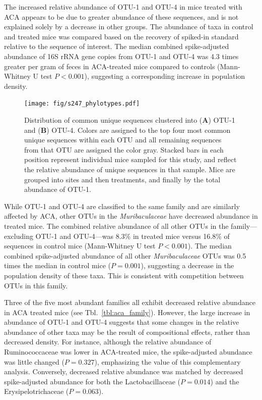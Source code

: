 \documentclass{doc/template/bmcart-nofigbox}
\newcommand{\frnlang}[1]{\textit{#1}}
\newcommand{\taxon}[1]{\frnlang{#1}}
\begin{document}
The increased relative abundance of OTU-1 and OTU-4 in mice treated with
ACA appears to be due to greater abundance of these sequences, and is not
explained solely by a decrease in other groups.
The abundance of taxa in control and treated mice was
compared based on the recovery of spiked-in standard relative to the sequence
of interest.
The median combined spike-adjusted abundance of 16S rRNA gene copies from OTU-1
and OTU-4 was 4.3 times greater per gram of feces in ACA-treated mice compared
to controls (Mann-Whitney U test $P < 0.001$),
suggesting a corresponding increase in population density.

\begin{figure}
\texttt{[image: fig/s247\_phylotypes.pdf]}
  \caption{\label{fig:s247_phylotypes}
  Distribution of common unique sequences clustered
  into (\textbf{A}) OTU-1 and (\textbf{B}) OTU-4.
  Colors are assigned to the top four most common unique sequences within each
  OTU and all remaining sequences from that OTU are assigned the color gray.
  Stacked bars in each position represent individual mice sampled for this study,
  and reflect the relative abundance of unique sequences in that sample.
  Mice are grouped into sites and then treatments, and finally by the
  total abundance of OTU-1.}
\end{figure}

While OTU-1 and OTU-4 are classified to the same family and are similarly
affected by ACA, other OTUs in the \taxon{Muribaculaceae} have decreased abundance in
treated mice.
The combined relative abundance of
all other OTUs in the family---excluding OTU-1 and OTU-4---was
8.3\% in treated mice versus 16.8\% of sequences in control mice
(Mann-Whitney U test $P < 0.001$).
The median combined spike-adjusted abundance of all other \taxon{Muribaculaceae} OTUs
was 0.5 times the median in control mice ($P = 0.001$), suggesting a
decrease in the population density of these taxa.
This is consistent with competition between OTUs in this family.

Three of the five most abundant families all exhibit decreased relative
abundance in ACA treated mice (see Tbl.~\ref{tbl:aca_family}).
However, the large increase in abundance of OTU-1 and OTU-4
suggests that some changes in the relative abundance of other taxa may be the
result of compositional effects, rather than decreased density.
For instance, although the relative abundance of Ruminococcaceae was lower in
ACA-treated mice, the spike-adjusted abundance was little changed ($P = 0.327$),
emphasizing the value of this complementary analysis.
Conversely, decreased relative abundance was matched by decreased
spike-adjusted abundance for both the Lactobacillaceae ($P = 0.014$) and
the Erysipelotrichaceae ($P = 0.063$).
\end{document}
